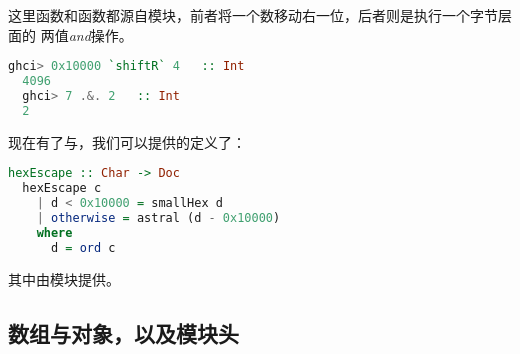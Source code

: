 \documentclass[./main.tex]{subfiles}
\begin{document}
这里函数和函数都源自模块，前者将一个数移动右一位，后者则是执行一个字节层面的
两值\textit{and}操作。

\begin{lstlisting}[language=Haskell]
  ghci> 0x10000 `shiftR` 4   :: Int
  4096
  ghci> 7 .&. 2   :: Int
  2
\end{lstlisting}

现在有了与，我们可以提供的定义了：

\begin{lstlisting}[language=Haskell]
  hexEscape :: Char -> Doc
  hexEscape c
    | d < 0x10000 = smallHex d
    | otherwise = astral (d - 0x10000)
    where
      d = ord c
\end{lstlisting}

其中由模块提供。

\subsection*{数组与对象，以及模块头}

\end{document}
